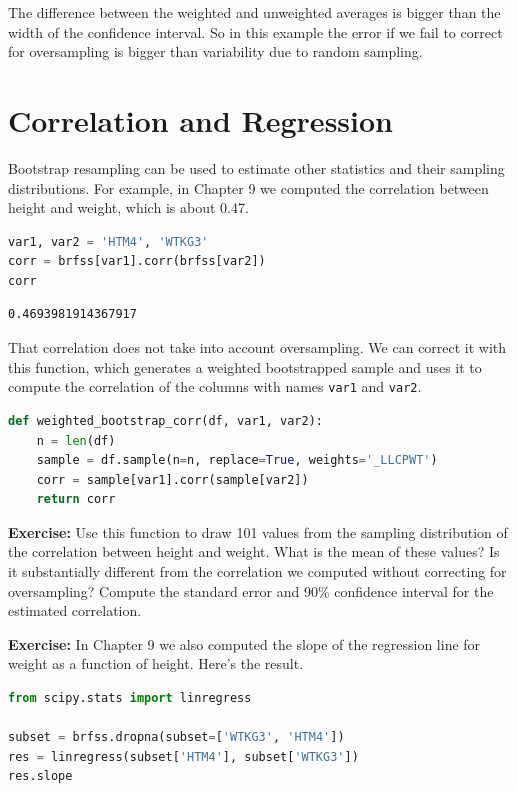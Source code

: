The difference between the weighted and unweighted averages is bigger
than the width of the confidence interval. So in this example the error
if we fail to correct for oversampling is bigger than variability due to
random sampling.

\section{Correlation and Regression}\label{correlation-and-regression}

Bootstrap resampling can be used to estimate other statistics and their
sampling distributions. For example, in Chapter 9 we computed the
correlation between height and weight, which is about 0.47.

\begin{lstlisting}[language=Python,style=source]
var1, var2 = 'HTM4', 'WTKG3'
corr = brfss[var1].corr(brfss[var2])
corr
\end{lstlisting}

\begin{lstlisting}[style=output]
0.4693981914367917
\end{lstlisting}

That correlation does not take into account oversampling. We can correct
it with this function, which generates a weighted bootstrapped sample
and uses it to compute the correlation of the columns with names
\passthrough{\lstinline!var1!} and \passthrough{\lstinline!var2!}.

\begin{lstlisting}[language=Python,style=source]
def weighted_bootstrap_corr(df, var1, var2):
    n = len(df)
    sample = df.sample(n=n, replace=True, weights='_LLCPWT')
    corr = sample[var1].corr(sample[var2])
    return corr
\end{lstlisting}

\textbf{Exercise:} Use this function to draw 101 values from the
sampling distribution of the correlation between height and weight. What
is the mean of these values? Is it substantially different from the
correlation we computed without correcting for oversampling? Compute the
standard error and 90\% confidence interval for the estimated
correlation.

\textbf{Exercise:} In Chapter 9 we also computed the slope of the
regression line for weight as a function of height. Here's the result.

\begin{lstlisting}[language=Python,style=source]
from scipy.stats import linregress

subset = brfss.dropna(subset=['WTKG3', 'HTM4'])
res = linregress(subset['HTM4'], subset['WTKG3'])
res.slope
\end{lstlisting}

